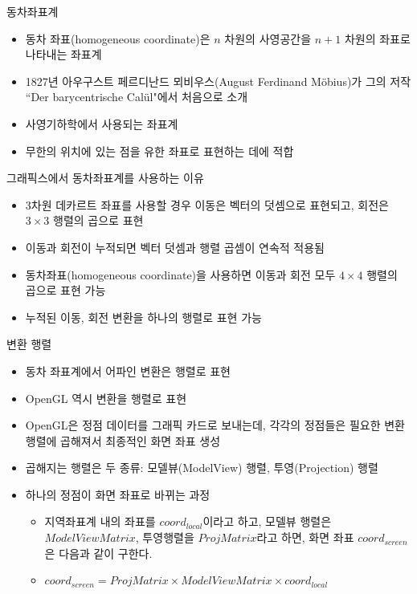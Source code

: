 \documentclass{beamer}
\begin{document}
\begin{frame}[fragile]{동차좌표계}

\begin{itemize}
\item 동차 좌표(homogeneous coordinate)은 $n$ 차원의 사영공간을 $n+1$ 차원의 좌표로 나타내는 좌표계
\item 1827년 아우구스트 페르디난드 뫼비우스(August Ferdinand M\"{o}bius)가 그의 저작 ``Der barycentrische Cal\"{u}l"에서 처음으로 소개
\item 사영기하학에서 사용되는 좌표계
\item 무한의 위치에 있는 점을 유한 좌표로 표현하는 데에 적합
\end{itemize}

\begin{block}{그래픽스에서 동차좌표계를 사용하는 이유}
\begin{itemize}
\item 3차원 데카르트 좌표를 사용할 경우 이동은 벡터의 덧셈으로 표현되고, 회전은 $3 \times 3$ 행렬의 곱으로 표현
\item 이동과 회전이 누적되면 벡터 덧셈과 행렬 곱셈이 연속적 적용됨
\item 동차좌표(homogeneous coordinate)을 사용하면 이동과 회전 모두 $4 \times 4$ 행렬의 곱으로 표현 가능
\item 누적된 이동, 회전 변환을 하나의 행렬로 표현 가능
\end{itemize}
\end{block}

\end{frame}


\begin{frame}[fragile]{변환 행렬}

\begin{itemize}
\item 동차 좌표계에서 어파인 변환은 행렬로 표현
\item OpenGL 역시 변환을 행렬로 표현
\item OpenGL은 정점 데이터를 그래픽 카드로 보내는데, 각각의 정점들은 필요한 변환 행렬에 곱해져서 최종적인 화면 좌표 생성
\item 곱해지는 행렬은 두 종류: 모델뷰(ModelView) 행렬, 투영(Projection) 행렬
\item 하나의 정점이 화면 좌표로 바뀌는 과정
	\begin{itemize}
	\item 지역좌표계 내의 좌표를 $coord_{local}$이라고 하고, 모델뷰 행렬은 $ModelViewMatrix$, 투영행렬을 $ProjMatrix$라고 하면, 화면 좌표 $coord_{screen}$은 다음과 같이 구한다.
	\item $coord_{screen} = ProjMatrix  \times ModelViewMatrix \times coord_{local}$
	\end{itemize}
\end{itemize}

\end{frame}
\end{document}
